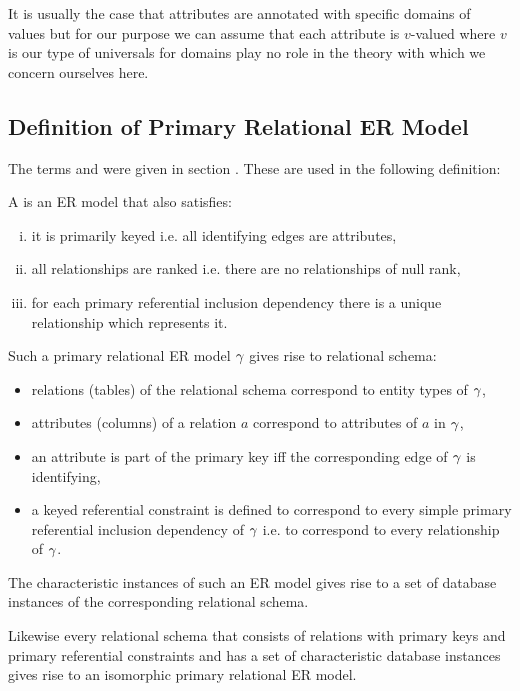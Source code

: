 It is usually the case that attributes are annotated with specific domains of values but for our purpose we can assume that each attribute is $v$-valued where $v$ is our type of universals for domains play no role in the theory with which we concern ourselves here.
\subsection{Definition of Primary Relational ER Model}
The terms  and 
 were given in 
section . These are used in the following definition:
\begin{definition}
\noindent 
A  is an  ER model that also satisfies:
\begin{enumerate}[(i)]
\item
it is primarily keyed i.e. all identifying edges are attributes, 
\item
all relationships are ranked i.e. there are no relationships of null rank,
\item 
for each primary referential inclusion dependency there is a unique relationship which represents it.
\end{enumerate} 
\end{definition}

Such a primary relational ER model $\gamma$ gives rise to relational schema:
\begin{itemize}
\item relations (tables) of the relational schema correspond to entity types of $\gamma$,
\item attributes (columns) of a relation $a$ correspond to attributes of $a$ in $\gamma$, 
\item an attribute is part of the primary key iff the corresponding edge of $\gamma$ is identifying,
\item a keyed referential constraint is defined to correspond to every simple primary referential inclusion dependency of $\gamma$ i.e. to correspond to every relationship of $\gamma$. 
\end{itemize}

The characteristic instances of such an ER model gives rise to a set of database instances of the corresponding relational schema.

Likewise every relational schema that consists of relations with primary keys and primary referential constraints and has a set of characteristic database instances gives rise to an isomorphic primary relational ER model. 

